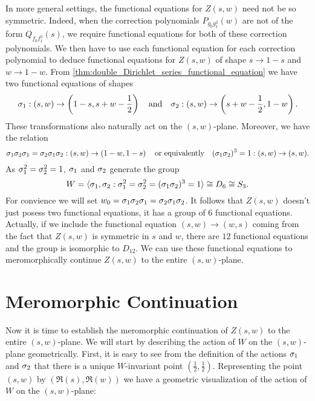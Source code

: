 \documentclass[12pt,reqno,oneside]{amsart}
\begin{document}
    In more general settings, the functional equations for $Z(s,w)$ need not be so symmetric. Indeed, when the correction polynomials $P_{g_{0}g_{1}^{2}}(w)$ are not of the form $Q_{f_{0}f_{1}^{2}}(s)$, we require functional equations for both of these correction polynomials. We then have to use each functional equation for each correction polynomial to deduce functional equations for $Z(s,w)$ of shape $s \to 1-s$ and $w \to 1-w$. From \cref{thm:double_Dirichlet_series_functional_equation} we have two functional equations of shapes
    \[
        \sigma_{1}:(s,w) \to \left(1-s,s+w-\frac{1}{2}\right) \quad \text{and} \quad \sigma_{2}:(s,w) \to \left(s+w-\frac{1}{2},1-w\right).
    \]
    These transformations also naturally act on the $(s,w)$-plane. Moreover, we have the relation
    \[
        \sigma_{1}\sigma_{2}\sigma_{1} = \sigma_{2}\sigma_{1}\sigma_{2}:(s,w) \to \left(1-w,1-s\right) \quad \text{or equivalently} \quad (\sigma_{1}\sigma_{2})^{3} = 1:(s,w) \to (s,w).
    \]
    As $\sigma_{1}^{2} = \sigma_{2}^{2} = 1$, $\sigma_{1}$ and $\sigma_{2}$ generate the group
    \[
        W = \langle\sigma_{1},\sigma_{2}:\sigma_{1}^{2} = \sigma_{2}^{2} = (\sigma_{1}\sigma_{2})^{3} = 1\rangle \cong D_{6} \cong S_{3}.
    \]
    For convience we will set $w_{0} = \sigma_{1}\sigma_{2}\sigma_{1} = \sigma_{2}\sigma_{1}\sigma_{2}$. It follows that $Z(s,w)$ doesn't just posess two functional equations, it has a group of $6$ functional equations. Actually, if we include the functional equation $(s,w) \to (w,s)$ coming from the fact that $Z(s,w)$ is symmetric in $s$ and $w$, there are $12$ functional equations and the group is isomorphic to $D_{12}$. We can use these functional equations to meromorphically continue $Z(s,w)$ to the entire $(s,w)$-plane.
\section{Meromorphic Continuation}
    Now it is time to establish the meromorphic continuation of $Z(s,w)$ to the entire $(s,w)$-plane. We will start by describing the action of $W$ on the $(s,w)$-plane geometrically. First, it is easy to see from the definition of the actions $\sigma_{1}$ and $\sigma_{2}$ that there is a unique $W$-invariant point $\left(\frac{1}{2},\frac{1}{2}\right)$. Representing the point $(s,w)$ by $(\Re(s),\Re(w))$ we have a geometric visualization of the action of $W$ on the $(s,w)$-plane:
\end{document}
